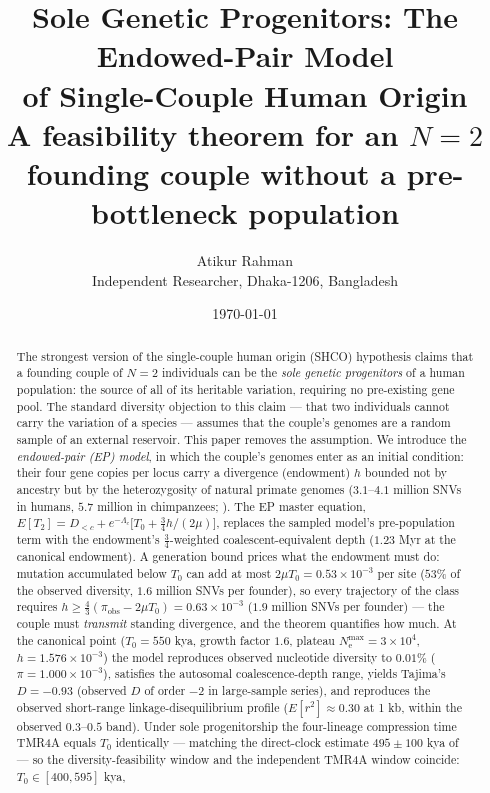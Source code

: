 \documentclass[11pt,a4paper]{article}
\title{\bfseries Sole Genetic Progenitors: The Endowed-Pair Model\\
of Single-Couple Human Origin\\[6pt]
\large A feasibility theorem for an $N=2$ founding couple without a
pre-bottleneck population}
\author{Atikur Rahman\\
\small Independent Researcher, Dhaka-1206, Bangladesh}
\date{\today}
\newcommand{\Ne}{N_{\mathrm{e}}}
\begin{document}
\maketitle

\begin{abstract}
\noindent The strongest version of the single-couple human origin (SHCO)
hypothesis claims that a founding couple of $N=2$ individuals can be the
\emph{sole genetic progenitors} of a human population: the source of all of
its heritable variation, requiring no pre-existing gene pool. The standard
diversity objection to this claim --- that two individuals cannot carry the
variation of a species --- assumes that the couple's genomes are a random
sample of an external reservoir. This paper removes the assumption. We
introduce the \emph{endowed-pair
(EP) model}, in which the couple's genomes enter as an initial condition:
their four gene copies per locus carry a divergence (endowment) $h$ bounded
not by ancestry but by the heterozygosity of natural primate genomes
($3.1$--$4.1$ million SNVs in humans, $5.7$ million in chimpanzees;
\citealp{PradoMartinez2013,Auton2015}). The EP master equation,
$E[T_2] = D_{<c} + e^{-\Lambda_c}\bigl[T_0 + \tfrac34 h/(2\mu)\bigr]$,
replaces the sampled model's pre-population term with the endowment's
$\tfrac34$-weighted coalescent-equivalent depth ($1.23$ Myr at the
canonical endowment).
A generation bound prices what the endowment must do: mutation accumulated
below $T_0$ can add at most $2\mu T_0 = 0.53\times10^{-3}$ per site ($53\%$
of the observed diversity, $1.6$ million SNVs per founder), so every
trajectory of the class requires $h \ge \tfrac43(\pi_{\mathrm{obs}} - 2\mu T_0)
= 0.63\times10^{-3}$ ($1.9$ million SNVs per founder) --- the couple must
\emph{transmit} standing divergence, and the theorem quantifies how much.
At the canonical point ($T_0 = 550$ kya, growth factor $1.6$, plateau
$\Ne^{\max} = 3\times10^4$, $h = 1.576\times10^{-3}$) the model reproduces
observed nucleotide diversity to $0.01\%$ ($\pi = 1.000\times10^{-3}$),
satisfies the autosomal coalescence-depth range, yields Tajima's $D =
-0.93$ (observed $D$ of order $-2$ in large-sample series), and reproduces
the observed short-range linkage-disequilibrium profile ($E[r^2] \approx
0.30$ at 1 kb, within the observed $0.3$--$0.5$ band). Under sole
progenitorship the four-lineage compression time TMR4A equals $T_0$
identically --- matching the direct-clock estimate $495 \pm 100$ kya of
\citet{Swamidass2019,Swamidass2022} --- so the diversity-feasibility
window and the independent TMR4A window coincide: $T_0 \in [400, 595]$ kya,

\end{abstract}
\end{document}
